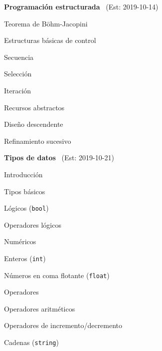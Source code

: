 \begin{longenum}
\begin{longenum}
    \end{longenum}
    \item \textbf{Programación estructurada} \ (Est: 2019-10-14)
    \begin{longenum}
        \item Teorema de Böhm-Jacopini
        \item Estructuras básicas de control
        \begin{longenum}
            \item Secuencia
            \item Selección
            \item Iteración
        \end{longenum}
        \item Recursos abstractos
        \item Diseño descendente
        \item Refinamiento sucesivo
    \end{longenum}
    \item \textbf{Tipos de datos} \ (Est: 2019-10-21)
    \begin{longenum}
        \item Introducción
        \item Tipos básicos
        \begin{longenum}
            \item Lógicos (\texttt{bool})
            \begin{longenum}
                \item Operadores lógicos
            \end{longenum}
            \item Numéricos
            \begin{longenum}
                \item Enteros (\texttt{int})
                \item Números en coma flotante (\texttt{float})
                \item Operadores
                \begin{longenum}
                    \item Operadores aritméticos
                    \item Operadores de incremento/decremento
                \end{longenum}
            \end{longenum}
            \item Cadenas (\texttt{string})
            \begin{longenum}

\end{longenum}
\end{longenum}
\end{longenum}
\end{longenum}
